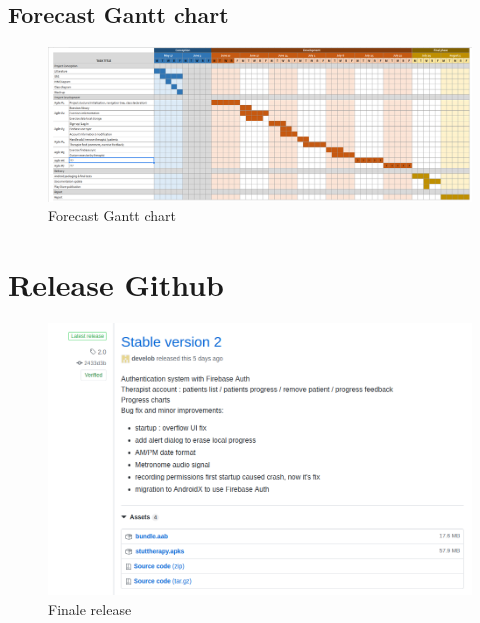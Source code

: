\begin{appendices}
\begin{landscape}
  \chapter{Forecast Gantt chart}
  \begin{figure}[H]
    \includegraphics[width=1\linewidth]{content/imgs/gantt.png}
    \caption*{Forecast Gantt chart}
  \end{figure}
\end{landscape}


\chapter{Release Github}
\label{appendix:release}
\begin{figure}[H]
  \includegraphics[width=1\linewidth]{content/imgs/release_ex.png}
  \caption*{Finale release}
\end{figure}


\end{appendices}
